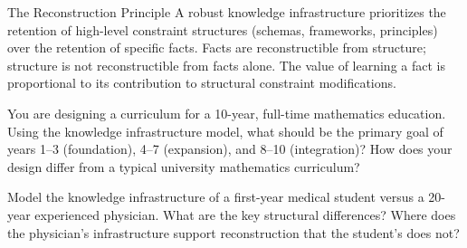 \begin{namedthm}{The Reconstruction Principle}
  A robust knowledge infrastructure prioritizes the retention of
  high-level constraint structures (schemas, frameworks, principles)
  over the retention of specific facts. Facts are reconstructible
  from structure; structure is not reconstructible from facts alone.
  The value of learning a fact is proportional to its contribution
  to structural constraint modifications.
\end{namedthm}

\begin{exercise}
  You are designing a curriculum for a 10-year, full-time mathematics
  education. Using the knowledge infrastructure model, what should
  be the primary goal of years 1--3 (foundation), 4--7 (expansion),
  and 8--10 (integration)? How does your design differ from a
  typical university mathematics curriculum?
\end{exercise}

\begin{exercise}
  Model the knowledge infrastructure of a first-year medical student
  versus a 20-year experienced physician. What are the key structural
  differences? Where does the physician's infrastructure support
  reconstruction that the student's does not?
\end{exercise}
